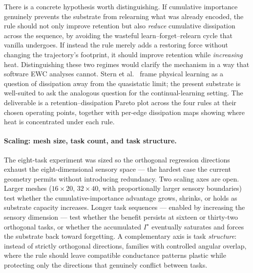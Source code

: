 \documentclass[11pt]{article}
\begin{document}
There is a concrete hypothesis worth distinguishing. If cumulative
importance genuinely prevents the substrate from relearning what was
already encoded, the rule should not only improve retention but also
\emph{reduce} cumulative dissipation across the sequence, by avoiding
the wasteful learn--forget--relearn cycle that vanilla undergoes. If
instead the rule merely adds a restoring force without changing the
trajectory's footprint, it should improve retention while
\emph{increasing} heat. Distinguishing these two regimes would clarify
the mechanism in a way that software EWC analyses cannot. Stern et
al.~\cite{stern2024} frame physical learning as a question of
dissipation away from the quasistatic limit; the present substrate is
well-suited to ask the analogous question for the continual-learning
setting. The deliverable is a retention--dissipation Pareto plot across
the four rules at their chosen operating points, together with per-edge
dissipation maps showing where heat is concentrated under each rule.

\paragraph{Scaling: mesh size, task count, and task structure.}
The eight-task experiment was sized so the orthogonal regression
directions exhaust the eight-dimensional sensory space --- the hardest
case the current geometry permits without introducing redundancy. Two
scaling axes are open. Larger meshes ($16\times 20$, $32\times 40$,
with proportionally larger sensory boundaries) test whether the
cumulative-importance advantage grows, shrinks, or holds as substrate
capacity increases. Longer task sequences --- enabled by increasing the
sensory dimension --- test whether the benefit persists at sixteen or
thirty-two orthogonal tasks, or whether the accumulated $I^\star$
eventually saturates and forces the substrate back toward forgetting. A
complementary axis is task \emph{structure}: instead of strictly
orthogonal directions, families with controlled angular overlap, where
the rule should leave compatible conductance patterns plastic while
protecting only the directions that genuinely conflict between tasks.
\end{document}
